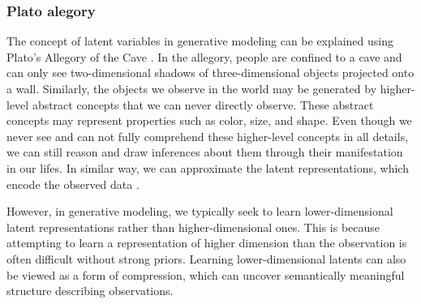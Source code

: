 \subsubsection*{Plato alegory}
The concept of latent variables in generative modeling can be explained using Plato's Allegory of the Cave \cite{plato-alegory}. 
In the allegory, people are confined to a cave and can only see two-dimensional shadows of three-dimensional objects projected onto a wall. 
Similarly, the objects we observe in the world may be generated by higher-level abstract concepts that we can never directly observe. 
These abstract concepts may represent properties such as color, size, and shape. Even though we never see and can not fully comprehend these 
higher-level concepts in all details, we can still reason and draw inferences about them through their manifestation in our lifes. In similar
way, we can approximate the latent representations, which encode the observed data \cite{diffusion-models-blog-2018}.  

However, in generative modeling, we typically seek to learn lower-dimensional latent representations rather than higher-dimensional ones. 
This is because attempting to learn a representation of higher dimension than the observation is often difficult without strong priors. 
Learning lower-dimensional latents can also be viewed as a form of compression, which can uncover semantically meaningful structure describing
observations.

